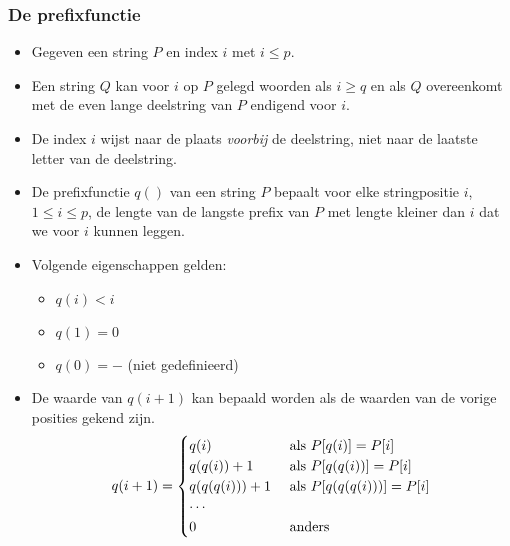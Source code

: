 \subsubsection{De prefixfunctie}
\begin{itemize}
    \item Gegeven een string $P$ en index $i$ met $i \leq p$.
    \item Een string $Q$ kan voor $i$ op $P$ gelegd woorden als $i \geq q$ en als $Q$ overeenkomt met de even lange deelstring van $P$ endigend voor $i$.
    \item De index $i$ wijst naar de plaats \textit{voorbij} de deelstring, niet naar de laatste letter van de deelstring.
    \item De prefixfunctie $q()$ van een string $P$ bepaalt voor elke stringpositie $i$, $1 \leq i \leq p$, de lengte van de langste prefix van $P$ met lengte kleiner dan $i$ dat we voor $i$ kunnen leggen.

    \item Volgende eigenschappen gelden:
    \begin{itemize}
        \item $q(i) < i$
        \item $q(1) = 0$
        \item $q(0) = -$ (niet gedefinieerd)
    \end{itemize}
    \item De waarde van $q(i + 1)$ kan bepaald worden als de waarden van de vorige posities gekend zijn.
    $$q(i + 1) = \begin{cases}
        q(i) & \hbox{ als } P[q(i)] = P[i]  \\
        q(q(i)) + 1 & \hbox{ als } P[q(q(i))] = P[i] \\
        q(q(q(i))) + 1 & \hbox{ als } P[q(q(q(i)))] = P[i] \\
        \cdots \\
        0 & \hbox { anders }
    \end{cases}$$


\end{itemize}
